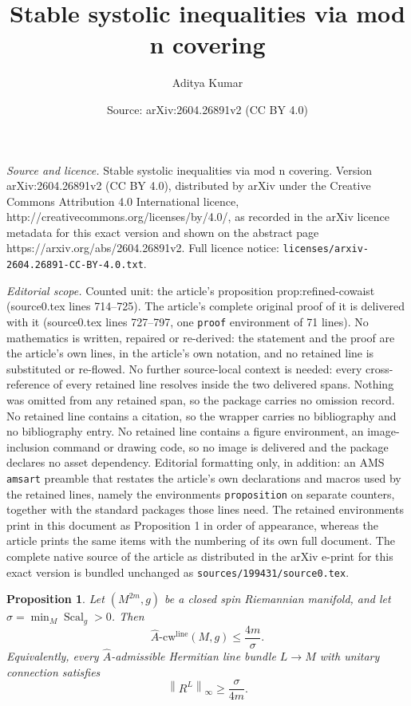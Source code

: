 \documentclass[10pt,a4paper]{amsart}
\title{Stable systolic inequalities via mod n covering}
\author{Aditya Kumar}
\date{Source: arXiv:2604.26891v2 (CC BY 4.0)}
\newtheorem{proposition}{Proposition}
\newcommand{\Ah}{\widehat A}
\newcommand{\Ahcwline}{\widehat A\text{-}\mathrm{cw}^{\mathrm{line}}}
\DeclareMathOperator{\Scal}{Scal}
\newcommand{\norm}[1]{\left\lVert #1\right\rVert}
\begin{document}
\maketitle

\noindent\emph{Source and licence.} Stable systolic inequalities via mod n covering. Version arXiv:2604.26891v2 (CC BY 4.0), distributed by arXiv under the Creative Commons Attribution 4.0 International licence, http://creativecommons.org/licenses/by/4.0/, as recorded in the arXiv licence metadata for this exact version and shown on the abstract page https://arxiv.org/abs/2604.26891v2. Full licence notice: \texttt{licenses/arxiv-2604.26891-CC-BY-4.0.txt}.\par\smallskip

\noindent\textit{Editorial scope.} Counted unit: the article's proposition prop:refined-cowaist (source0.tex lines 714--725). The article's complete original proof of it is delivered with it (source0.tex lines 727--797, one \texttt{proof} environment of 71 lines). No mathematics is written, repaired or re-derived: the statement and the proof are the article's own lines, in the article's own notation, and no retained line is substituted or re-flowed.  No further source-local context is needed: every cross-reference of every retained line resolves inside the two delivered spans.  Nothing was omitted from any retained span, so the package carries no omission record.  No retained line contains a citation, so the wrapper carries no bibliography and no bibliography entry.  No retained line contains a figure environment, an image-inclusion command or drawing code, so no image is delivered and the package declares no asset dependency.  Editorial formatting only, in addition: an AMS \texttt{amsart} preamble that restates the article's own declarations and macros used by the retained lines, namely the environments \texttt{proposition} on separate counters, together with the standard packages those lines need.  The retained environments print in this document as Proposition 1 in order of appearance, whereas the article prints the same items with the numbering of its own full document.  The complete native source of the article as distributed in the arXiv e-print for this exact version is bundled unchanged as \texttt{sources/199431/source0.tex}.
\begin{proposition}\label{prop:refined-cowaist}
Let \((M^{2m},g)\) be a closed spin Riemannian manifold, and let \(\sigma=\min_M\Scal_g>0\). Then
\[
\Ahcwline(M,g)
\le
\frac{4m}{\sigma}.
\]
Equivalently, every \(\Ah\)-admissible Hermitian line bundle \(L\to M\) with unitary connection satisfies
\begin{equation}\label{eq:waistequiv}
\norm{R^L}_\infty \ge \frac{\sigma}{4m}.
\end{equation}
\end{proposition}
\end{document}
